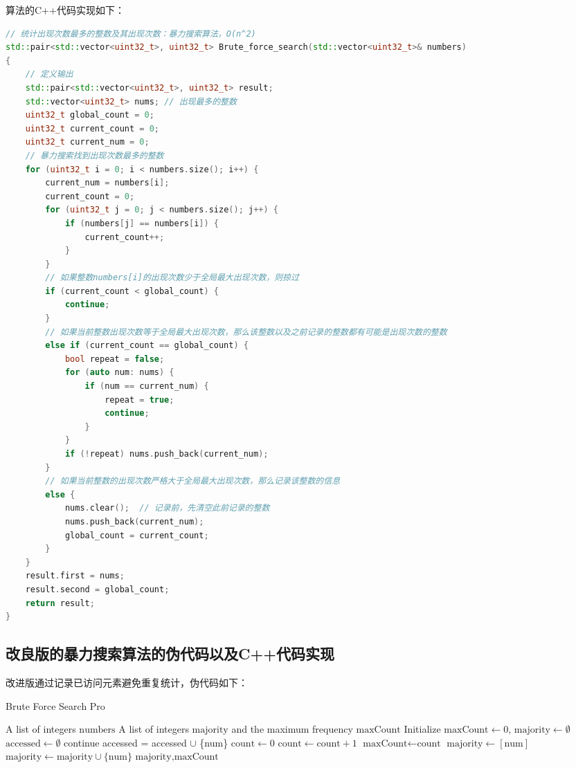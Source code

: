 \documentclass[UTF8,12pt,a4paper]{ctexart}
\begin{document}
算法的C++代码实现如下：
\begin{lstlisting}[language={C++}, basicstyle=\ttfamily\footnotesize]
// 统计出现次数最多的整数及其出现次数：暴力搜索算法，O(n^2)
std::pair<std::vector<uint32_t>, uint32_t> Brute_force_search(std::vector<uint32_t>& numbers)
{
    // 定义输出
    std::pair<std::vector<uint32_t>, uint32_t> result;
    std::vector<uint32_t> nums; // 出现最多的整数
    uint32_t global_count = 0;
    uint32_t current_count = 0;
    uint32_t current_num = 0;
    // 暴力搜索找到出现次数最多的整数
    for (uint32_t i = 0; i < numbers.size(); i++) {
        current_num = numbers[i];
        current_count = 0;
        for (uint32_t j = 0; j < numbers.size(); j++) {
            if (numbers[j] == numbers[i]) {
                current_count++;
            }
        }
        // 如果整数numbers[i]的出现次数少于全局最大出现次数，则掠过
        if (current_count < global_count) {
            continue;
        }
        // 如果当前整数出现次数等于全局最大出现次数，那么该整数以及之前记录的整数都有可能是出现次数的整数
        else if (current_count == global_count) {
            bool repeat = false;
            for (auto num: nums) {
                if (num == current_num) {
                    repeat = true;
                    continue;
                }
            }
            if (!repeat) nums.push_back(current_num);
        }
        // 如果当前整数的出现次数严格大于全局最大出现次数，那么记录该整数的信息
        else {
            nums.clear();  // 记录前，先清空此前记录的整数
            nums.push_back(current_num);
            global_count = current_count;
        }
    }
    result.first = nums;
    result.second = global_count;
    return result;
}
\end{lstlisting}

\subsection{改良版的暴力搜索算法的伪代码以及C++代码实现}
改进版通过记录已访问元素避免重复统计，伪代码如下：
\begin{algorithm}[H]
	\caption{Brute Force Search Pro}
	\begin{algorithmic}[1]
	\Require A list of integers $\text{numbers}$
	\Ensure A list of integers $\text{majority}$ and the maximum frequency $\text{maxCount}$
	\State Initialize $\text{maxCount} \gets 0$, $\text{majority} \gets \emptyset$ $\text{accessed} \gets \emptyset$
			\State continue
		\EndIf
		\State accessed = accessed $\cup$ \{num\}
		\State $\text{count} \gets 0$
				\State $\text{count} \gets \text{count} + 1$
			\EndIf
		\EndFor
			\State $\text{maxCount} \gets \text{count}$
			\State $\text{majority} \gets [\text{num}]$
			\State $\text{majority} \gets \text{majority} \cup \{\text{num}\}$
		\EndIf
	\EndFor
	\State \Return $\text{majority}, \text{maxCount}$
\end{algorithmic}
\end{algorithm}
\end{document}

